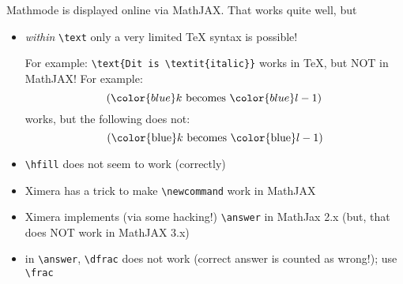 \documentclass{ximera}
\begin{document}
\author{Wim Obbels}

\label{xim:failcase}


Mathmode is displayed online via MathJAX. That works quite well, but
\begin{itemize}
\item \textit{within} \verb|\text| only a very limited TeX syntax is possible!

For example: \verb|\text{Dit is \textit{italic}}| works in TeX, but NOT in MathJAX!
For example:
$$
({\color{blue}k} \text{ becomes } {\color{blue}l-1})
$$
works, but the following does not:
$$
\text{({\color{blue}$k$} becomes  {\color{blue}$l-1$})}
$$


\item  \verb|\hfill| does not seem to work (correctly)
\item Ximera has a trick to make \verb|\newcommand| work in MathJAX
\item Ximera implements (via some hacking!) \verb|\answer| in MathJax 2.x (but, that does NOT work in MathJAX 3.x)
\end{itemize}


\begin{itemize}
\item in \verb|\answer|, \verb|\dfrac| does not work (correct answer is counted as wrong!); use \verb|\frac|
\end{itemize}

\end{document}
